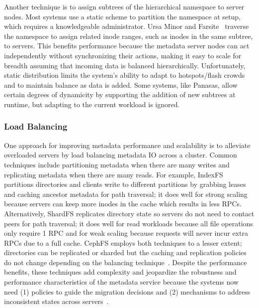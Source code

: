 Another technique is to assign subtrees of the hierarchical namespace to server
nodes. Most systems use a static scheme to partition the namespace at setup,
which requires a knowledgeable administrator. Ursa Minor and
Farsite~\cite{doucer:osdi2006-farsite-dir} traverse the namespace to assign
related inode ranges, such as inodes in the same subtree, to servers. This
benefits performance because the metadata server nodes can act independently
without synchronizing their actions, making it easy to scale for breadth
assuming that incoming data is balanced hierarchically.  Unfortunately, static
distribution limits the system's ability to adapt to hotspots/flash crowds and
to maintain balance as data is added.  Some systems, like Panasas, allow
certain degrees of dynamicity by supporting the addition of new subtrees at
runtime, but adapting to the current workload is ignored. 


\subsubsection{Load Balancing}

One approach for improving metadata performance and scalability is to alleviate
overloaded servers by load balancing metadata IO across a cluster. Common
techniques include partitioning metadata when there are many writes and
replicating metadata when there are many reads. For example, IndexFS partitions
directories and clients write to different partitions by grabbing leases and
caching ancestor metadata for path traversal; it does well for strong scaling
because servers can keep more inodes in the cache which results in less RPCs.
Alternatively, ShardFS replicates directory state so servers do not need to
contact peers for path traversal; it does well for read workloads because all
file operations only require 1 RPC and for weak scaling because requests will
never incur extra RPCs due to a full cache.  CephFS employs both techniques to
a lesser extent; directories can be replicated or sharded but the caching and
replication policies do not change depending on the balancing
technique~\cite{weil:sc2004-dyn-metadata, weil:phdthesis07}.  Despite the
performance benefits, these techniques add complexity and jeopardize the
robustness and performance characteristics of the metadata service because the
systems now need (1) policies to guide the migration decisions and (2)
mechanisms to address inconsistent states across
servers~\cite{sevilla:sc15-mantle}.

